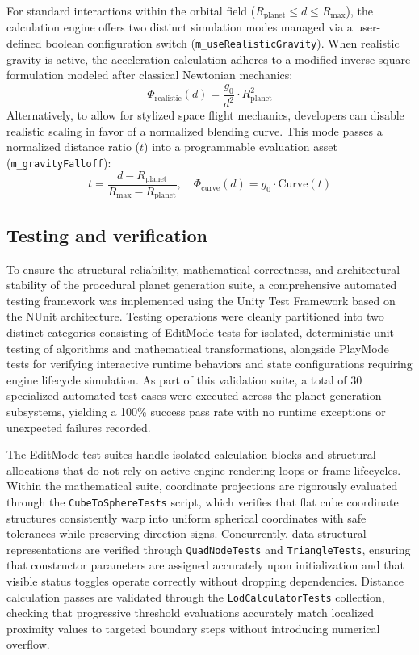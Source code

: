 \documentclass[12pt]{report}
\begin{document}
For standard interactions within the orbital field ($R_{\text{planet}} \le d \le R_{\text{max}}$), the calculation engine offers two distinct simulation modes managed via a user-defined boolean configuration switch (\texttt{m\_useRealisticGravity}). When realistic gravity is active, the acceleration calculation adheres to a modified inverse-square formulation modeled after classical Newtonian mechanics:
\begin{equation}
\Phi_{\text{realistic}}(d) = \frac{g_0}{d^2} \cdot R_{\text{planet}}^2
\end{equation}
Alternatively, to allow for stylized space flight mechanics, developers can disable realistic scaling in favor of a normalized blending curve. This mode passes a normalized distance ratio ($t$) into a programmable evaluation asset (\texttt{m\_gravityFalloff}):
\begin{equation}
t = \frac{d - R_{\text{planet}}}{R_{\text{max}} - R_{\text{planet}}}, \quad \Phi_{\text{curve}}(d) = g_0 \cdot \text{Curve}(t)
\end{equation}

\subsection{Testing and verification}

To ensure the structural reliability, mathematical correctness, and architectural stability of the procedural planet generation suite, a comprehensive automated testing framework was implemented using the Unity Test Framework based on the NUnit architecture. Testing operations were cleanly partitioned into two distinct categories consisting of EditMode tests for isolated, deterministic unit testing of algorithms and mathematical transformations, alongside PlayMode tests for verifying interactive runtime behaviors and state configurations requiring engine lifecycle simulation. As part of this validation suite, a total of 30 specialized automated test cases were executed across the planet generation subsystems, yielding a 100\% success pass rate with no runtime exceptions or unexpected failures recorded.

The EditMode test suites handle isolated calculation blocks and structural allocations that do not rely on active engine rendering loops or frame lifecycles. Within the mathematical suite, coordinate projections are rigorously evaluated through the \texttt{CubeToSphereTests} script, which verifies that flat cube coordinate structures consistently warp into uniform spherical coordinates with safe tolerances while preserving direction signs. Concurrently, data structural representations are verified through \texttt{QuadNodeTests} and \texttt{TriangleTests}, ensuring that constructor parameters are assigned accurately upon initialization and that visible status toggles operate correctly without dropping dependencies. Distance calculation passes are validated through the \texttt{LodCalculatorTests} collection, checking that progressive threshold evaluations accurately match localized proximity values to targeted boundary steps without introducing numerical overflow.
\end{document}
